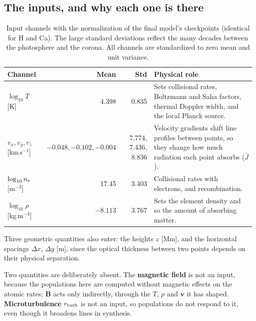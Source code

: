 \subsection{The inputs, and why each one is there}
\begin{table}[H]\centering\small
\begin{tabularx}{\linewidth}{lrrY}
\toprule
Channel&Mean&Std&Physical role\\\midrule
$\log_{10}T$ [K]&4.398&0.835&Sets collisional rates, Boltzmann and Saha factors, thermal Doppler width, and the local Planck source.\\
$v_x,v_y,v_z$ [km\,s$^{-1}$]&$-0.048,-0.102,-0.004$&7.774, 7.436, 8.836&Velocity gradients shift line profiles between points, so they change how much radiation each point absorbs ($\bar J$).\\
$\log_{10}n_{\rm e}$ [m$^{-3}$]&17.45&3.403&Collisional rates with electrons, and recombination.\\
$\log_{10}\rho$ [kg\,m$^{-3}$]&$-8.113$&3.767&Sets the element density and so the amount of absorbing matter.\\
\bottomrule
\end{tabularx}
\caption{Input channels with the normalization of the final model's checkpoints (identical for H and Ca). The large standard deviations reflect the many decades between the photosphere and the corona. All channels are standardized to zero mean and unit variance.}
\end{table}

Three geometric quantities also enter: the heights $z$ [Mm], and the horizontal spacings $\Delta x$, $\Delta y$ [m], since the optical thickness between two points depends on their physical separation.

Two quantities are deliberately absent. The \textbf{magnetic field} is not an input, because the populations here are computed without magnetic effects on the atomic rates; $\mathbf B$ acts only indirectly, through the $T$, $\rho$ and $\mathbf v$ it has shaped. \textbf{Microturbulence} $v_{\rm turb}$ is not an input, so populations do not respond to it, even though it broadens lines in synthesis.

